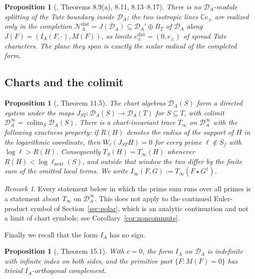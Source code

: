 \documentclass[11pt]{amsart}
\newtheorem{proposition}[theorem]{Proposition}
\theoremstyle{definition}
\theoremstyle{remark}
\newtheorem{remark}[theorem]{Remark}
\newcommand{\C}{\mathbb C}
\newcommand{\DA}{\mathcal D_A}
\newcommand{\BT}{B_T}
\begin{document}
\begin{proposition}[\cite{P43}, Theorems 8.9(a), 8.11, 8.13--8.17]
\label{prop:rulings}
There is no $\DA$-module splitting of the Tate boundary inside $\DA$; the two
isotropic lines $\C e_\pm$ are realized only in the completion
$\mathcal N_A^{\mathrm{dist}}=\overline{J(\DA)}\subseteq\DA'\oplus\BT$ of
$\DA$ along $J(F)=(I_A(F,\cdot),M(F))$, as limits
$e_\pm^{\mathrm{dist}}=(0,e_\pm)$ of spread Tate characters.  The plane they span
is exactly the scalar radical of the completed form.
\end{proposition}

\subsection{Charts and the colimit}

\begin{proposition}[\cite{P43}, Theorem 11.5]
\label{prop:colimit}
The chart algebras $\DA(S)$ form a directed system under the maps
$J_{ST}\colon\DA(S)\to\DA(T)$ for $S\subseteq T$, with colimit
$\DA^\infty=\operatorname*{colim}_S\DA(S)$.  There is a chart-invariant trace
$T_\infty$ on $\DA^\infty$ with the following exactness property: if
$R(H)$ denotes the radius of the support of $H$ in the logarithmic coordinate,
then $W_\ell(J_{ST}H)=0$ for every prime $\ell\notin S_f$ with
$\log\ell>R(H)$.  Consequently $T_S(H)=T_\infty(H)$ whenever
$R(H)<\log\ell_{\mathrm{next}}(S)$, and outside that window the two differ by
the finite sum of the omitted local terms.  We write
$I_\infty(F,G):=T_\infty(F\star G^\dagger)$.
\end{proposition}

\begin{remark}
\label{rem:C1}
Every statement below in which the prime sum runs over all primes is a
statement about $T_\infty$ on $\DA^\infty$.  This does not apply to the
continued Euler-product symbol of Section~\ref{sec:polar}, which is an
analytic continuation and not a limit of chart symbols; see
Corollary~\ref{cor:noncommute}.
\end{remark}

Finally we recall that the form $I_A$ has no sign.

\begin{proposition}[\cite{P43}, Theorem 15.1]
\label{prop:indefinite}
With $c=0$, the form $I_A$ on $\DA$ is indefinite with infinite index on both
sides, and the primitive part $\{F: M(F)=0\}$ has trivial $I_A$-orthogonal
complement.
\end{proposition}
\end{document}
